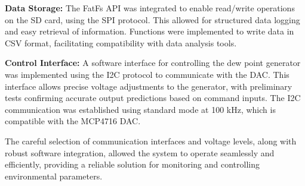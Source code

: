 \textbf{Data Storage:} The FatFs API was integrated to enable read/write operations on the SD card, 
using the SPI protocol. This allowed for structured data logging and easy retrieval of information. 
Functions were implemented to write data in CSV format, facilitating compatibility with data analysis tools.

\textbf{Control Interface:}  A software interface for controlling the dew point generator was implemented 
using the I2C protocol to communicate with the DAC. This interface allows precise voltage adjustments to 
the generator, with preliminary tests confirming accurate output predictions based on command inputs. 
The I2C communication was established using standard mode at 100 kHz, which is compatible with the MCP4716 DAC.

The careful selection of communication interfaces and voltage levels, along with robust software 
integration, allowed the system to operate seamlessly and efficiently, providing a reliable solution 
for monitoring and controlling environmental parameters.